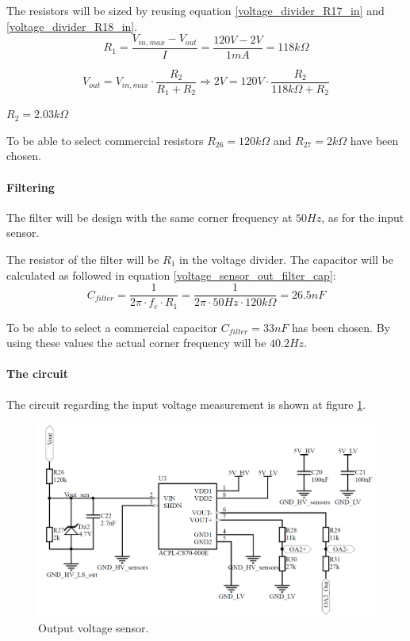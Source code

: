\noindent The resistors will be sized by reusing equation \ref{voltage_divider_R17_in} and \ref{voltage_divider_R18_in}.
\begin{equation}
	R_{1} = \frac{V_{in,max}-V_{out}}{I} = \frac{120V-2V}{1mA} = 118k\Omega	
\end{equation}

\begin{equation} 
	V_{out} = V_{in,max} \cdot \frac{R_{2}}{R_{1}+R_{2}} \Rightarrow 2V = 120V \cdot \frac{R_{2}}{118k\Omega+R_{2}}
\end{equation}
\begin{center}
	$R_{2} = 2.03k\Omega$
\end{center}

\noindent To be able to select commercial resistors $R_{26} = 120k\Omega$ and $R_{27} = 2k\Omega$ have been chosen. 

\paragraph{Filtering}
The filter will be design with the same corner frequency at $50Hz$, as for the input sensor.

The resistor of the filter will be $R_{1}$ in the voltage divider. The capacitor will be calculated as followed in equation \ref{voltage_sensor_out_filter_cap}:
\begin{equation} \label{voltage_sensor_out_filter_cap}
	C_{filter} = \frac{1}{2\pi \cdot f_c \cdot R_{1}} = \frac{1}{2 \pi \cdot 50Hz \cdot 120k\Omega} = 26.5nF
\end{equation}

To be able to select a commercial capacitor $C_{filter} = 33nF$ has been chosen. By using these values the actual corner frequency will be $40.2 Hz$.

\paragraph{The circuit}
The circuit regarding the input voltage measurement is shown at figure \ref{fig:output_voltage_sensor_circuit}. 

\begin{figure}[H]
	\begin{center}
		\includegraphics[width=0.7\linewidth]{../Pictures/P1/Sensors/output_voltage_sensor.PNG}
		\caption{Output voltage sensor.}
		\label{fig:output_voltage_sensor_circuit}
	\end{center}
\end{figure}


